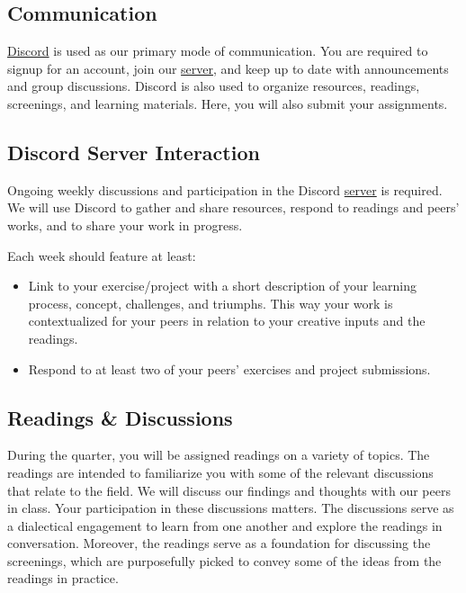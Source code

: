 \hypertarget{communication}{%
      \subsection{Communication}}

\href{http://discordapp.com/}{Discord} is used as our primary mode of communication. You are required to signup for an account, join our \href{\discordURL}{server}, and keep up to date with announcements and group discussions. Discord is also used to organize resources, readings, screenings, and learning materials. Here, you will also submit your assignments.

\subsection{Discord Server Interaction}
Ongoing weekly discussions and participation in the Discord \href{\discordURL}{server} is required. We will use Discord to gather and share resources, respond to readings and peers' works, and to share your work in progress.

Each week should feature at least:
\begin{itemize}
      \tightlist
      \item Link to your exercise/project with a short description of your learning process, concept, challenges, and triumphs. This way your work is contextualized for your peers in relation to your creative inputs and the readings.
      \item Respond to at least two of your peers' exercises and project submissions.
\end{itemize}

\subsection{Readings \& Discussions}

During the quarter, you will be assigned readings on a variety of topics. The readings are intended to familiarize you with some of the relevant discussions that relate to the field. We will discuss our findings and thoughts with our peers in class. Your participation in these discussions matters. The discussions serve as a dialectical engagement to learn from one another and explore the readings in conversation. Moreover, the readings serve as a foundation for discussing the screenings, which are purposefully picked to convey some of the ideas from the readings in practice.

